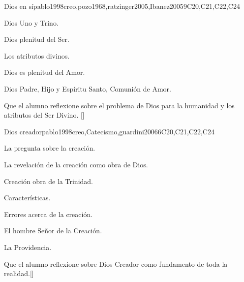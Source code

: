 \begin{syllabus}
\begin{unit}{}{Dios en sí}{pablo1998creo,pozo1968,ratzinger2005,Ibanez2005}{9}{C20,C21,C22,C24}
\begin{topics}
	\item Dios Uno y Trino.
	    \begin{subtopics}
		\item Dios plenitud del Ser.
		\item Los atributos divinos.
		\item Dios es plenitud del Amor.
		\item Dios Padre, Hijo y Espíritu Santo, Comunión de Amor.
	    \end{subtopics}
\end{topics}
\begin{learningoutcomes}
	\item Que el  alumno reflexione sobre el problema de Dios para la humanidad y los atributos del Ser Divino. [\Familiarity]
\end{learningoutcomes}
\end{unit}

\begin{unit}{}{Dios creador}{pablo1998creo,Catecismo,guardini2006}{6}{C20,C21,C22,C24}
\begin{topics}
	\item La pregunta sobre la creación.
	      \begin{subtopics}
		\item La revelación de la creación como obra de Dios.
		\item Creación obra de la Trinidad.
		\item Características.
		\item Errores acerca de la creación.
		\item El hombre Señor de la Creación.
		\item La Providencia.
	      \end{subtopics}
\end{topics}
\begin{learningoutcomes}
	\item Que el  alumno reflexione sobre Dios Creador como fundamento de toda la realidad.[\Familiarity]
\end{learningoutcomes}
\end{unit}


\end{syllabus}
